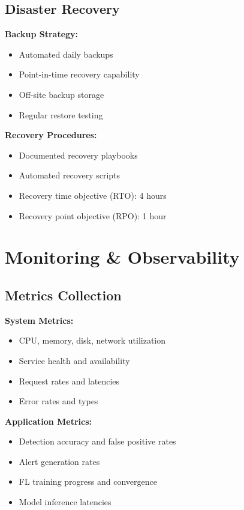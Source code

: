 \documentclass[12pt,a4paper]{article}
\begin{document}
\subsection{Disaster Recovery}

\textbf{Backup Strategy:}
\begin{itemize}[leftmargin=1cm,itemsep=0pt]
    \item Automated daily backups
    \item Point-in-time recovery capability
    \item Off-site backup storage
    \item Regular restore testing
\end{itemize}

\textbf{Recovery Procedures:}
\begin{itemize}[leftmargin=1cm,itemsep=0pt]
    \item Documented recovery playbooks
    \item Automated recovery scripts
    \item Recovery time objective (RTO): 4 hours
    \item Recovery point objective (RPO): 1 hour
\end{itemize}


\section{Monitoring \& Observability}

\subsection{Metrics Collection}

\textbf{System Metrics:}
\begin{itemize}[leftmargin=1cm,itemsep=0pt]
    \item CPU, memory, disk, network utilization
    \item Service health and availability
    \item Request rates and latencies
    \item Error rates and types
\end{itemize}

\textbf{Application Metrics:}
\begin{itemize}[leftmargin=1cm,itemsep=0pt]
    \item Detection accuracy and false positive rates
    \item Alert generation rates
    \item FL training progress and convergence
    \item Model inference latencies
\end{itemize}
\end{document}
